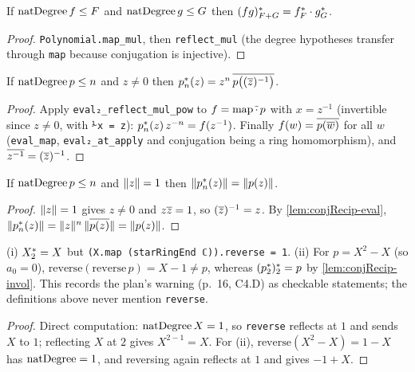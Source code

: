 \begin{lemma}[multiplicativity]\label{lem:conjRecip-mul}
If $\natdeg\,f\le F$ and $\natdeg\,g\le G$ then
$\crec{F+G}{(fg)}=\crec{F}{f}\cdot\crec{G}{g}$.
\end{lemma}
\begin{proof}
\texttt{Polynomial.map\_mul}, then \texttt{reflect\_mul} (the degree
hypotheses transfer through \texttt{map} because conjugation is injective).
\end{proof}

\begin{lemma}[evaluation]\label{lem:conjRecip-eval}
If $\natdeg\,p\le n$ and $z\ne0$ then $\crec{n}{p}(z)=z^n\,\cj{p\big((\cj z)^{-1}\big)}$.
\end{lemma}
\begin{proof}
Apply \texttt{eval₂\_reflect\_mul\_pow} to $f=\mathrm{map}\,\cj\cdot\,p$ with
$x=z^{-1}$ (invertible since $z\ne0$, with \texttt{⅟x = z}): $\crec np(z)\,z^{-n}=f(z^{-1})$.
Finally $f(w)=\cj{p(\cj w)}$ for all $w$ (\texttt{eval\_map}, \texttt{eval₂\_at\_apply}
and conjugation being a ring homomorphism), and $\cj{z^{-1}}=(\cj z)^{-1}$.
\end{proof}

\begin{lemma}\label{lem:conjRecip-circle}
If $\natdeg\,p\le n$ and $\nm z=1$ then $\nm{\crec{n}{p}(z)}=\nm{p(z)}$.
\end{lemma}
\begin{proof}
$\nm z=1$ gives $z\ne0$ and $z\cj z=1$, so $(\cj z)^{-1}=z$. By
\ref{lem:conjRecip-eval}, $\nm{\crec np(z)}=\nm z^n\,\nm{\cj{p(z)}}=\nm{p(z)}$.
\end{proof}

\begin{lemma}\label{lem:reverse-trap}
(i) $\crec{2}{X}=X$ but \texttt{(X.map (starRingEnd ℂ)).reverse = 1}.
(ii) For $p=X^2-X$ (so $a_0=0$), $\mathrm{reverse}(\mathrm{reverse}\,p)=X-1\ne p$,
whereas $\crec{2}{(\crec{2}{p})}=p$ by \ref{lem:conjRecip-invol}.
This records the plan's warning (p.~16, C4.D) as checkable statements; the
definitions above never mention \texttt{reverse}.
\end{lemma}
\begin{proof}
Direct computation: $\natdeg\,X=1$, so \texttt{reverse} reflects at $1$ and sends
$X$ to $1$; reflecting $X$ at $2$ gives $X^{2-1}=X$. For (ii),
$\mathrm{reverse}(X^2-X)=1-X$ has $\natdeg=1$, and reversing again reflects at
$1$ and gives $-1+X$.
\end{proof}

